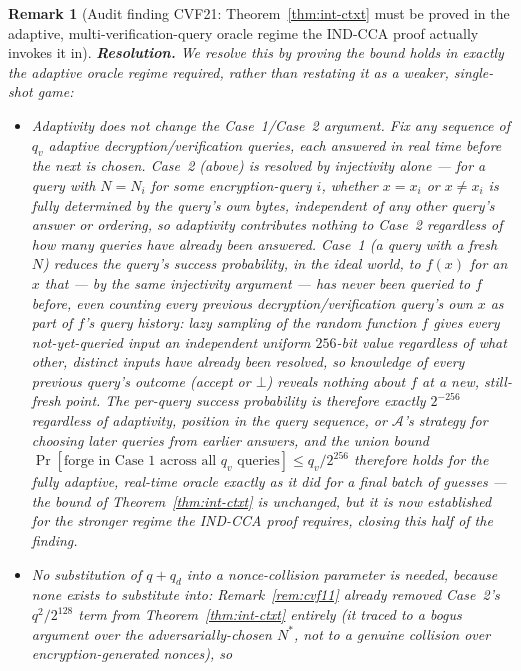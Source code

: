 \documentclass[11pt,a4paper]{article}
\newtheorem{remark}[theorem]{Remark}
\begin{document}
\begin{remark}[Audit finding CVF21: Theorem~\ref{thm:int-ctxt} must be proved in the adaptive, multi-verification-query oracle regime the IND-CCA proof actually invokes it in]
\textbf{Resolution.} We resolve this by proving the bound holds in
exactly the adaptive oracle regime required, rather than restating it as
a weaker, single-shot game:
\begin{itemize}
  \item \emph{Adaptivity does not change the Case~1/Case~2 argument.}
        Fix any sequence of $q_v$ adaptive decryption/verification queries,
        each answered in real time before the next is chosen. Case~2
        (above) is resolved by injectivity alone --- for a query with
        $N=N_i$ for some encryption-query $i$, whether $x=x_i$ or
        $x\neq x_i$ is fully determined by the query's own bytes,
        independent of any other query's answer or ordering, so
        adaptivity contributes nothing to Case~2 regardless of how many
        queries have already been answered. Case~1 (a query with a fresh
        $N$) reduces the query's success probability, in the ideal
        world, to $f(x)$ for an $x$ that --- by the same injectivity
        argument --- has never been queried to $f$ before, \emph{even
        counting every previous decryption/verification query's own $x$
        as part of $f$'s query history}: lazy sampling of the random
        function $f$ gives every not-yet-queried input an independent
        uniform $256$-bit value regardless of what other, distinct inputs
        have already been resolved, so knowledge of every previous
        query's outcome (accept or $\bot$) reveals nothing about $f$ at a
        new, still-fresh point. The per-query success probability is
        therefore exactly $2^{-256}$ regardless of adaptivity, position in
        the query sequence, or $\mathcal{A}$'s strategy for choosing later
        queries from earlier answers, and the union bound
        $\Pr[\text{forge in Case 1 across all } q_v \text{ queries}] \leq
        q_v/2^{256}$ therefore holds for the fully adaptive, real-time
        oracle exactly as it did for a final batch of guesses --- the
        \emph{bound} of Theorem~\ref{thm:int-ctxt} is unchanged, but it is
        now established for the stronger regime the IND-CCA proof
        requires, closing this half of the finding.
  \item \emph{No substitution of $q+q_d$ into a nonce-collision parameter
        is needed}, because none exists to substitute into:
        Remark~\ref{rem:cvf11} already removed Case~2's $q^2/2^{128}$ term
        from Theorem~\ref{thm:int-ctxt} entirely (it traced to a bogus
        argument over the adversarially-chosen $N^*$, not to a genuine
        collision over encryption-generated nonces), so

\end{itemize}
\end{remark}
\end{document}

